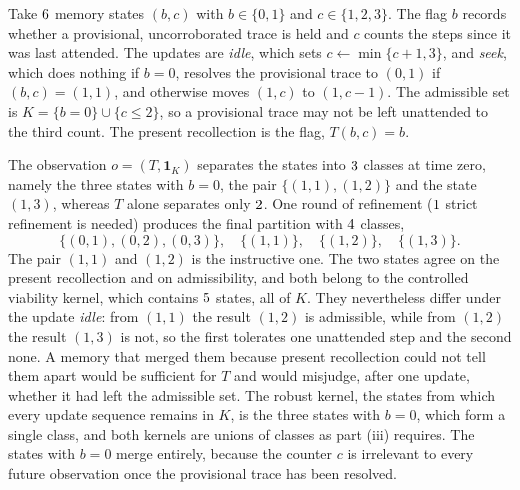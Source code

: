 \begin{workedex}\label{ex:viabequiv37}
Take $6$ memory states $(b,c)$ with $b\in\{0,1\}$ and $c\in\{1,2,3\}$. The flag $b$ records whether a provisional, uncorroborated trace is held and $c$ counts the steps since it was last attended. The updates are \emph{idle}, which sets $c\leftarrow\min\{c+1,3\}$, and \emph{seek}, which does nothing if $b=0$, resolves the provisional trace to $(0,1)$ if $(b,c)=(1,1)$, and otherwise moves $(1,c)$ to $(1,c-1)$. The admissible set is $K=\{b=0\}\cup\{c\le2\}$, so a provisional trace may not be left unattended to the third count. The present recollection is the flag, $T(b,c)=b$.

The observation $o=(T,\mathbf 1_K)$ separates the states into $3$ classes at time zero, namely the three states with $b=0$, the pair $\{(1,1),(1,2)\}$ and the state $(1,3)$, whereas $T$ alone separates only $2$. One round of refinement ($1$ strict refinement is needed) produces the final partition with $4$ classes,
\begin{equation}
\bigl\{(0,1),(0,2),(0,3)\bigr\},\quad\bigl\{(1,1)\bigr\},\quad\bigl\{(1,2)\bigr\},\quad\bigl\{(1,3)\bigr\}.
\end{equation}
The pair $(1,1)$ and $(1,2)$ is the instructive one. The two states agree on the present recollection and on admissibility, and both belong to the controlled viability kernel, which contains $5$ states, all of $K$. They nevertheless differ under the update \emph{idle}: from $(1,1)$ the result $(1,2)$ is admissible, while from $(1,2)$ the result $(1,3)$ is not, so the first tolerates one unattended step and the second none. A memory that merged them because present recollection could not tell them apart would be sufficient for $T$ and would misjudge, after one update, whether it had left the admissible set. The robust kernel, the states from which every update sequence remains in $K$, is the three states with $b=0$, which form a single class, and both kernels are unions of classes as part (iii) requires. The states with $b=0$ merge entirely, because the counter $c$ is irrelevant to every future observation once the provisional trace has been resolved.
\end{workedex}

